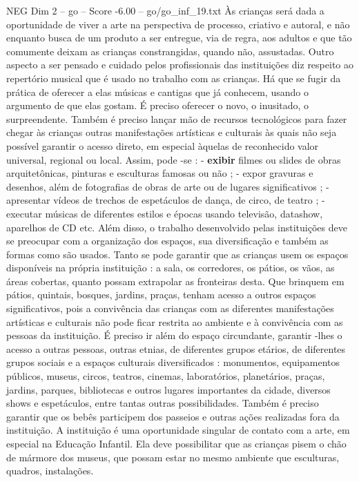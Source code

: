 \begin{textsample}{NEG Dim 2 – go – Score -6.00 – go/go\_inf\_19.txt}
Às crianças será dada a oportunidade de viver a arte na perspectiva de processo, criativo e autoral, e não enquanto busca de um produto a ser entregue, via de regra, aos adultos e que tão comumente deixam as crianças constrangidas, quando não, assustadas.
Outro aspecto a ser pensado e cuidado pelos profissionais das instituições diz respeito ao repertório musical que é usado no trabalho com as crianças.
Há que se fugir da prática de oferecer a elas músicas e cantigas que já conhecem, usando o argumento de que elas gostam.
É preciso oferecer o novo, o inusitado, o surpreendente.
Também é preciso lançar mão de recursos tecnológicos para fazer chegar às crianças outras manifestações artísticas e culturais às quais não seja possível garantir o acesso direto, em especial àquelas de reconhecido valor universal, regional ou local.
Assim, pode -se : - \textbf{exibir} filmes ou slides de obras arquitetônicas, pinturas e esculturas famosas ou não ; - expor gravuras e desenhos, além de fotografias de obras de arte ou de lugares significativos ; - apresentar vídeos de trechos de espetáculos de dança, de circo, de teatro ; - executar músicas de diferentes estilos e épocas usando televisão, datashow, aparelhos de CD etc.
Além disso, o trabalho desenvolvido pelas instituições deve se preocupar com a organização dos espaços, sua diversificação e também as formas como são usados.
Tanto se pode garantir que as crianças usem os espaços disponíveis na própria instituição : a sala, os corredores, os pátios, os vãos, as áreas cobertas, quanto possam extrapolar as fronteiras desta.
Que brinquem em pátios, quintais, bosques, jardins, praças, tenham acesso a outros espaços significativos, pois a convivência das crianças com as diferentes manifestações artísticas e culturais não pode ficar restrita ao ambiente e à convivência com as pessoas da instituição.
É preciso ir além do espaço circundante, garantir -lhes o acesso a outras pessoas, outras etnias, de diferentes grupos etários, de diferentes grupos sociais e a espaços culturais diversificados : monumentos, equipamentos públicos, museus, circos, teatros, cinemas, laboratórios, planetários, praças, jardins, parques, bibliotecas e outros lugares importantes da cidade, diversos shows e espetáculos, entre tantas outras possibilidades.
Também é preciso garantir que os bebês participem dos passeios e outras ações realizadas fora da instituição.
A instituição é uma oportunidade singular de contato com a arte, em especial na Educação Infantil.
Ela deve possibilitar que as crianças pisem o chão de mármore dos museus, que possam estar no mesmo ambiente que esculturas, quadros, instalações.

\end{textsample}
